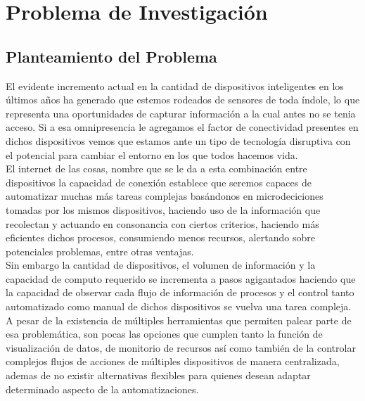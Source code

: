 

\chapter{Problema de Investigación}

\section{Planteamiento del Problema}
El evidente incremento actual en la cantidad de dispositivos inteligentes en los últimos años ha generado que estemos rodeados de sensores de toda índole, lo que representa una oportunidades de capturar información a la cual antes no se tenia acceso. Si a esa omnipresencia le agregamos el factor de conectividad presentes en dichos dispositivos vemos que estamos ante un tipo de tecnología disruptiva con el potencial para cambiar el entorno en los que todos hacemos vida. \\

El internet de las cosas, nombre que se le da a esta combinación entre dispositivos la capacidad de conexión establece que seremos capaces de automatizar muchas más tareas complejas basándonos en microdeciciones tomadas por los mismos dispositivos, haciendo uso de la información que recolectan y actuando en consonancia con ciertos criterios, haciendo más eficientes dichos procesos, consumiendo menos recursos, alertando sobre potenciales problemas, entre otras ventajas.\\

Sin embargo la cantidad de dispositivos, el volumen de información y la capacidad de computo requerido se incrementa a pasos agigantados haciendo que la capacidad de observar cada flujo de información de procesos y el control tanto automatizado como manual de dichos dispositivos se vuelva una tarea compleja. A pesar de la existencia de múltiples herramientas que permiten palear parte de esa problemática, son pocas las opciones que cumplen tanto la función de visualización de datos, de monitorio de recursos así como también de la controlar complejos flujos de acciones de múltiples dispositivos de manera centralizada, ademas de no existir alternativas flexibles para quienes desean adaptar determinado aspecto de la automatizaciones.


